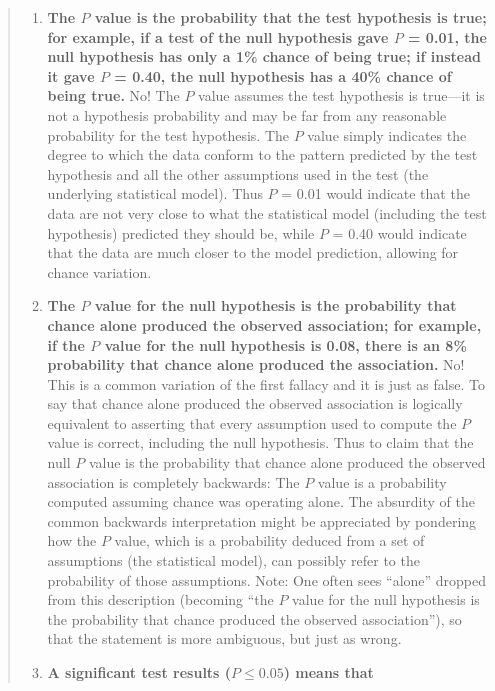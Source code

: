 \begin{quote}
  \begin{enumerate}
  \item \textbf{The $P$ value is the probability that the test
      hypothesis is true; for example, if a test of the null
      hypothesis gave $P$ = 0.01, the null hypothesis has only a 1\%
      chance of being true; if instead it gave $P$ = 0.40, the null
      hypothesis has a 40\% chance of being true.} No! The $P$ value
    assumes the test hypothesis is true---it is not a hypothesis
    probability and may be far from any reasonable probability for the
    test hypothesis. The $P$ value simply indicates the degree to
    which the data conform to the pattern predicted by the test
    hypothesis and all the other assumptions used in the test (the
    underlying statistical model). Thus $P$ = 0.01 would indicate that
    the data are not very close to what the statistical model
    (including the test hypothesis) predicted they should be, while
    $P$ = 0.40 would indicate that the data are much closer to the
    model prediction, allowing for chance variation. 
  \item \textbf{The $P$ value for the null hypothesis is the
      probability that chance alone produced the observed association;
      for example, if the $P$ value for the null hypothesis is 0.08,
      there is an 8\% probability that chance alone produced the
      association.}  No! This is a common variation of the first
    fallacy and it is just as false. To say that chance alone produced
    the observed association is logically equivalent to asserting that
    every assumption used to compute the $P$ value is correct, including
    the null hypothesis. Thus to claim that the null $P$ value is the
    probability that chance alone produced the observed association is
    completely backwards: The $P$ value is a probability computed
    assuming chance was operating alone. The absurdity of the common
    backwards interpretation might be appreciated by pondering how
    the $P$ value, which is a probability deduced from a set of
    assumptions (the statistical model), can possibly refer to the
    probability of those assumptions. Note: One often sees ``alone''
    dropped from this description (becoming ``the $P$ value for the null
    hypothesis is the probability that chance produced the observed
    association''), so that the statement is more ambiguous, but just
    as wrong.
  \item \textbf{A significant test results ($P\leq 0.05$) means that
}
\end{enumerate}
\end{quote}
